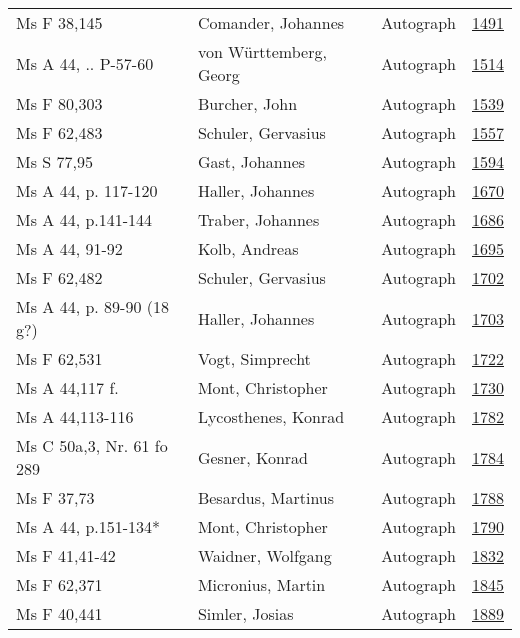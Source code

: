 \documentclass[10pt,a4paper,landscape]{report}
\begin{document}
\begin{longtable}{p{16cm}p{4cm}lr}
Ms F 38,145	&	Comander, Johannes	&	Autograph	&	\href{http://130.60.24.72/assignment/1491}{1491}\\
Ms A 44, .. P-57-60	&	von Württemberg, Georg	&	Autograph	&	\href{http://130.60.24.72/assignment/1514}{1514}\\
Ms F 80,303	&	Burcher, John	&	Autograph	&	\href{http://130.60.24.72/assignment/1539}{1539}\\
Ms F 62,483	&	Schuler, Gervasius	&	Autograph	&	\href{http://130.60.24.72/assignment/1557}{1557}\\
Ms S 77,95	&	Gast, Johannes	&	Autograph	&	\href{http://130.60.24.72/assignment/1594}{1594}\\
Ms A 44, p. 117-120	&	Haller, Johannes	&	Autograph	&	\href{http://130.60.24.72/assignment/1670}{1670}\\
Ms A 44, p.141-144	&	Traber, Johannes	&	Autograph	&	\href{http://130.60.24.72/assignment/1686}{1686}\\
Ms A 44, 91-92	&	Kolb, Andreas	&	Autograph	&	\href{http://130.60.24.72/assignment/1695}{1695}\\
Ms F 62,482	&	Schuler, Gervasius	&	Autograph	&	\href{http://130.60.24.72/assignment/1702}{1702}\\
Ms A 44, p. 89-90 (18 g?)	&	Haller, Johannes	&	Autograph	&	\href{http://130.60.24.72/assignment/1703}{1703}\\
Ms F 62,531	&	Vogt, Simprecht	&	Autograph	&	\href{http://130.60.24.72/assignment/1722}{1722}\\
Ms A 44,117 f.	&	Mont, Christopher	&	Autograph	&	\href{http://130.60.24.72/assignment/1730}{1730}\\
Ms A 44,113-116	&	Lycosthenes, Konrad	&	Autograph	&	\href{http://130.60.24.72/assignment/1782}{1782}\\
Ms C 50a,3, Nr. 61 fo 289	&	Gesner, Konrad	&	Autograph	&	\href{http://130.60.24.72/assignment/1784}{1784}\\
Ms F 37,73	&	Besardus, Martinus	&	Autograph	&	\href{http://130.60.24.72/assignment/1788}{1788}\\
Ms A 44, p.151-134*	&	Mont, Christopher	&	Autograph	&	\href{http://130.60.24.72/assignment/1790}{1790}\\
Ms F 41,41-42	&	Waidner, Wolfgang	&	Autograph	&	\href{http://130.60.24.72/assignment/1832}{1832}\\
Ms F 62,371	&	Micronius, Martin	&	Autograph	&	\href{http://130.60.24.72/assignment/1845}{1845}\\
Ms F 40,441	&	Simler, Josias	&	Autograph	&	\href{http://130.60.24.72/assignment/1889}{1889}\\

\end{longtable}
\end{document}
